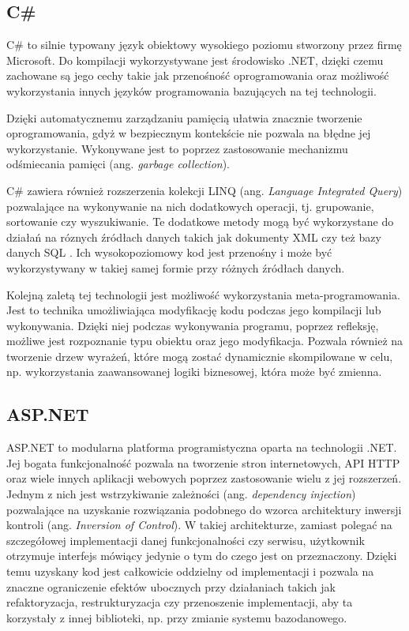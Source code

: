 \subsection*{C\#}
C\# to silnie typowany język obiektowy wysokiego poziomu stworzony przez firmę Microsoft.
Do kompilacji wykorzystywane jest środowisko .NET, dzięki czemu zachowane są
jego cechy takie jak przenośność oprogramowania oraz możliwość wykorzystania
innych języków programowania bazujących na tej technologii.

Dzięki automatycznemu zarządzaniu pamięcią ułatwia znacznie tworzenie
oprogramowania, gdyż w bezpiecznym kontekście nie pozwala na 
błędne jej wykorzystanie. Wykonywane jest to poprzez zastosowanie
mechanizmu odśmiecania pamięci (ang. \textit{garbage collection}).

C\# zawiera również rozszerzenia kolekcji LINQ (ang. \textit{Language Integrated Query})
pozwalające na wykonywanie na nich dodatkowych operacji, tj. grupowanie, sortowanie czy wyszukiwanie.
Te dodatkowe metody mogą być wykorzystane do działań na róznych źródłach danych takich jak dokumenty XML
czy też bazy danych SQL \cite{zhang2014}. Ich wysokopoziomowy kod jest przenośny i może być
wykorzystywany w takiej samej formie przy różnych źródłach danych.

Kolejną zaletą tej technologii jest możliwość wykorzystania meta-programowania. 
Jest to technika umożliwiająca modyfikację kodu podczas jego kompilacji lub wykonywania. 
Dzięki niej podczas wykonywania programu, poprzez refleksję, możliwe jest rozpoznanie
typu obiektu oraz jego modyfikacja. Pozwala również na tworzenie drzew wyrażeń, które
mogą zostać dynamicznie skompilowane w celu, np. wykorzystania zaawansowanej logiki
biznesowej, która może być zmienna.

\subsection*{ASP.NET}
ASP.NET to modularna platforma programistyczna oparta na technologii .NET. 
Jej bogata funkcjonalność pozwala na tworzenie stron internetowych, API HTTP oraz 
wiele innych aplikacji webowych poprzez zastosowanie wielu z jej rozszerzeń.
Jednym z nich jest wstrzykiwanie zależności (ang. \textit{dependency injection})
pozwalające na uzyskanie rozwiązania podobnego do wzorca architektury inwersji
kontroli (ang. \textit{Inversion of Control}). W takiej architekturze, zamiast
polegać na szczegółowej implementacji danej funkcjonalności czy serwisu,
użytkownik otrzymuje interfejs mówiący jedynie o tym do czego jest on przeznaczony.
Dzięki temu uzyskany kod jest całkowicie oddzielny od implementacji i pozwala
na znaczne ograniczenie efektów ubocznych przy działaniach takich jak refaktoryzacja,
restrukturyzacja czy przenoszenie implementacji, aby ta korzystały z innej biblioteki, np.
przy zmianie systemu bazodanowego.

